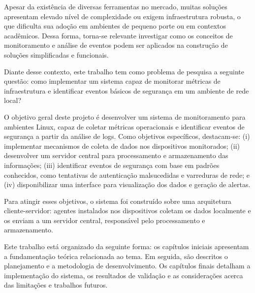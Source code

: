 \documentclass[
    12pt
    ,oneside
    ,a4paper
    ,chapter=TITLE
    ,section=TITLE
    ,sumario=abnt-6027-2012]{abntex2}
\begin{document}
Apesar da existência de diversas ferramentas no mercado, muitas soluções apresentam elevado nível de complexidade ou exigem infraestrutura robusta, o que dificulta sua adoção em ambientes de pequeno porte ou em contextos acadêmicos. Dessa forma, torna-se relevante investigar como os conceitos de monitoramento e análise de eventos podem ser aplicados na construção de soluções simplificadas e funcionais.

Diante desse contexto, este trabalho tem como problema de pesquisa a seguinte questão: como implementar um sistema capaz de monitorar métricas de infraestrutura e identificar eventos básicos de segurança em um ambiente de rede local?

O objetivo geral deste projeto é desenvolver um sistema de monitoramento para ambientes Linux, capaz de coletar métricas operacionais e identificar eventos de segurança a partir da análise de logs. Como objetivos específicos, destacam-se: (i) implementar mecanismos de coleta de dados nos dispositivos monitorados; (ii) desenvolver um servidor central para processamento e armazenamento das informações; (iii) identificar eventos de segurança com base em padrões conhecidos, como tentativas de autenticação malsucedidas e varreduras de rede; e (iv) disponibilizar uma interface para visualização dos dados e geração de alertas.

Para atingir esses objetivos, o sistema foi construído sobre uma arquitetura cliente-servidor: agentes instalados nos dispositivos coletam os dados localmente e os enviam a um servidor central, responsável pelo processamento e armazenamento.

Este trabalho está organizado da seguinte forma: os capítulos iniciais apresentam a fundamentação teórica relacionada ao tema. Em seguida, são descritos o planejamento e a metodologia de desenvolvimento. Os capítulos finais detalham a implementação do sistema, os resultados de validação e as considerações acerca das limitações e trabalhos futuros.


\end{document}
